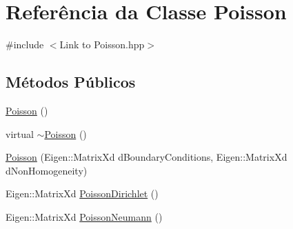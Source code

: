 \hypertarget{classPoisson}{\section{Referência da Classe Poisson}
\label{classPoisson}
}


{\ttfamily \#include $<$Link to Poisson.\-hpp$>$}

\subsection*{Métodos Públicos}
\begin{DoxyCompactItemize}
\item 
\hyperlink{classPoisson_adbd1c3f43c4942e54bc8223a4bef52b1}{Poisson} ()
\item 
virtual \hyperlink{classPoisson_adc599dacb253169758ed80a609917545}{$\sim$\-Poisson} ()
\item 
\hyperlink{classPoisson_af04413c35005739e700cc0f7d9d0f97e}{Poisson} (Eigen\-::\-Matrix\-Xd d\-Boundary\-Conditions, Eigen\-::\-Matrix\-Xd d\-Non\-Homogeneity)
\item 
Eigen\-::\-Matrix\-Xd \hyperlink{classPoisson_ad763521a1837fb4e10d3dff7de27ccd2}{Poisson\-Dirichlet} ()
\item 
Eigen\-::\-Matrix\-Xd \hyperlink{classPoisson_aeea1944937abc1533c582eb6d8d4c625}{Poisson\-Neumann} ()
\end{DoxyCompactItemize}


